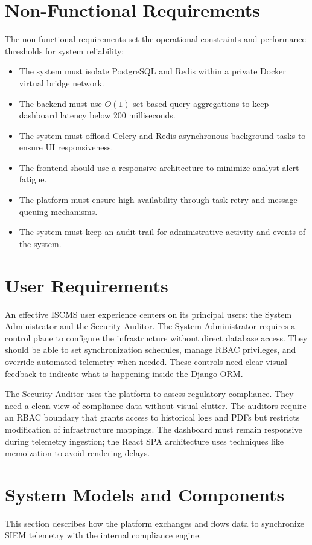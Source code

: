 \section{Non-Functional Requirements}
The non-functional requirements set the operational constraints and performance thresholds for system reliability:

\begin{itemize}
    \item The system must isolate PostgreSQL and Redis within a private Docker virtual bridge network.
    \item The backend must use $O(1)$ set-based query aggregations to keep dashboard latency below 200 milliseconds.
    \item The system must offload Celery and Redis asynchronous background tasks to ensure UI responsiveness.
    \item The frontend should use a responsive architecture to minimize analyst alert fatigue.
    \item The platform must ensure high availability through task retry and message queuing mechanisms.
    \item The system must keep an audit trail for administrative activity and events of the system.
\end{itemize}

\section{User Requirements}
An effective ISCMS user experience centers on its principal users: the System Administrator and the Security Auditor. The System Administrator requires a control plane to configure the infrastructure without direct database access. They should be able to set synchronization schedules, manage RBAC privileges, and override automated telemetry when needed. These controls need clear visual feedback to indicate what is happening inside the Django ORM.

The Security Auditor uses the platform to assess regulatory compliance. They need a clean view of compliance data without visual clutter. The auditors require an RBAC boundary that grants access to historical logs and PDFs but restricts modification of infrastructure mappings. The dashboard must remain responsive during telemetry ingestion; the React SPA architecture uses techniques like memoization to avoid rendering delays.

\section{System Models and Components}
This section describes how the platform exchanges and flows data to synchronize SIEM telemetry with the internal compliance engine.

